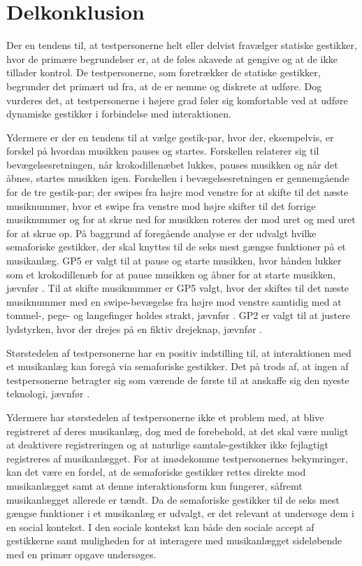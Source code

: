 \section{Delkonklusion}
\label{ValgAfGestikkerDelkonklusion}
%
Der en tendens til, at testpersonerne helt eller delvist fravælger statiske gestikker, hvor de primære begrundelser er, at de føles akavede at gengive og at de ikke tillader kontrol. De testpersonerne, som foretrækker de statiske gestikker, begrunder det primært ud fra, at de er nemme og diskrete at udføre. Dog vurderes det, at testpersonerne i højere grad føler sig komfortable ved at udføre dynamiske gestikker i forbindelse med interaktionen. 

Ydermere er der en tendens til at vælge gestik-par, hvor der, eksempelvis, er forskel på hvordan musikken pauses og startes. Forskellen relaterer sig til bevægelsesretningen, når krokodillenæbet lukkes, pauses musikken og når det åbnes, startes musikken igen. Forskellen i bevægelsesretningen er gennemgående for de tre gestik-par; der swipes fra højre mod venstre for at skifte til det næste musiknummer, hvor et swipe fra venstre mod højre skifter til det forrige musiknummer og for at skrue ned for musikken roteres der mod uret og med uret for at skrue op.\blankline
%
På baggrund af foregående analyse er der udvalgt hvilke semaforiske gestikker, der skal knyttes til de seks mest gængse funktioner på et musikanlæg. GP5 er valgt til at pause og starte musikken, hvor hånden lukker som et krokodillenæb for at pause musikken og åbner for at starte musikken, jævnfør . Til at skifte musiknummer er GP5 valgt, hvor der skiftes til det næste musiknummer med en swipe-bevægelse fra højre mod venstre samtidig med at tommel-, pege- og langefinger holdes strakt, jævnfør . GP2 er valgt til at justere lydstyrken, hvor der drejes på en fiktiv drejeknap, jævnfør . 

Størstedelen af testpersonerne har en positiv indstilling til, at interaktionen med et musikanlæg kan foregå via semaforiske gestikker. Det på trods af, at ingen af testpersonerne betragter sig som værende de første til at anskaffe sig den nyeste teknologi, jævnfør . 

Ydermere har størstedelen af testpersonerne ikke et problem med, at blive registreret af deres musikanlæg, dog med de forebehold, at det skal være muligt at deaktivere registreringen og at naturlige samtale-gestikker ikke fejlagtigt registreres af musikanlægget. For at imødekomme testpersonernes bekymringer, kan det være en fordel, at de semaforiske gestikker rettes direkte mod musikanlægget samt at denne interaktionsform kun fungerer, såfremt musikanlægget allerede er tændt. \blankline
%
Da de semaforiske gestikker til de seks mest gængse funktioner i et musikanlæg er udvalgt, er det relevant at undersøge dem i en social kontekst. I den sociale kontekst kan både den sociale accept af gestikkerne samt muligheden for at interagere med musikanlægget sideløbende med en primær opgave undersøges. 